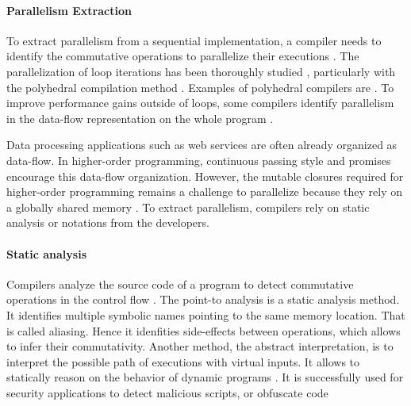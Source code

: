 
\paragraph{Parallelism Extraction}

To extract parallelism from a sequential implementation, a compiler needs to identify the commutative operations to parallelize their executions \cite{Rinard1996,Clements2013a}.
The parallelization of loop iterations has been thoroughly studied \cite{Mauras1989,Amarasinghe1995,Chen2008,Banerjee2013,Radoi2014}, particularly with the polyhedral compilation method \cite{Bastoul2004}.
Examples of polyhedral compilers are .
To improve performance gains outside of loops, some compilers identify parallelism in the data-flow representation on the whole program \cite{Beck1991,Catanzaro2009,Li2012}.

Data processing applications \cite{Fernandez2014a} such as web services \cite{Salmito2013} are often already organized as data-flow.
In higher-order programming, continuous passing style and promises encourage this data-flow organization.
However, the mutable closures required for higher-order programming remains a challenge to parallelize because they rely on a globally shared memory \cite{Harrison1989, Nicolay2010, Matsakis2012a}.
To extract parallelism, compilers rely on static analysis or notations from the developers.


\paragraph{Static analysis}

Compilers analyze the source code of a program to detect commutative operations in the control flow \cite{Allen1970}.
The point-to analysis is a static analysis method.
It identifies multiple symbolic names pointing to the same memory location.
That is called aliasing.
Hence it idenfities side-effects \cite{Andersen1994,Jang2009,Sridharan2012,Wei2014} between operations, which allows to infer their commutativity.
Another method, the abstract interpretation, is to interpret the possible path of executions with virtual inputs.
It allows to statically reason on the behavior of dynamic programs \cite{Maffeis2008,Smith2011,Gardner2012,Hackett2012,Raychev2013,Gardner2013,Bodin2014}.
It is successfully used for security applications to detect malicious scripts, or obfuscate code \cite{Huang2004,Jovanovic2006,Yu2007,Maffeis2009a,Chudnov2015,Dolby2015}

